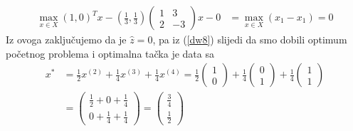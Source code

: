 \documentclass[a4paper, utf8, 11pt, colorlinks]{book}
\theoremstyle{definition}
\begin{document}
	 \begin{align*}
		\max_{x \in X} (1, 0)^T x - (\frac{1}{3}, \frac{1}{3})\left(\begin{array}{cc}
			1 & 3 \\
			2 & -3
		\end{array}\right)  x   - 0 &= \max_{x \in X} (x_1  - x_1 ) = 0    
	\end{align*} 
  Iz ovoga zaključujemo da je $\hat{z}=0$, pa iz (\ref{dw8}) slijedi da smo dobili optimum početnog problema i optimalna tačka je data sa 
\begin{align*}
  	 x^* &= \frac{1}{2}  x^{(2)}+ \frac{1}{4} x^{(3)} + \frac{1}{4} x^{(4)} 
  	     = \frac{1}{2} \begin{pmatrix}
  	     	      1 \\
  	     	      0
  	     \end{pmatrix} +
       \frac{1}{4} \begin{pmatrix}
       	                  0 \\
       	                  1
       \end{pmatrix} +
   \frac{1}{4} \begin{pmatrix}
   	                  1 \\
   	                  1
   \end{pmatrix}\\
   &= \begin{pmatrix}
   	        \frac{1}{2} + 0 + \frac{1}{4} \\
   	        0 + \frac{1}{4} + \frac{1}{4}
   \end{pmatrix} = \begin{pmatrix}
         \frac{3}{4} \\
         \frac{1}{2}
  \end{pmatrix}
\end{align*}
\vspace{1cm} \\
\end{document}
